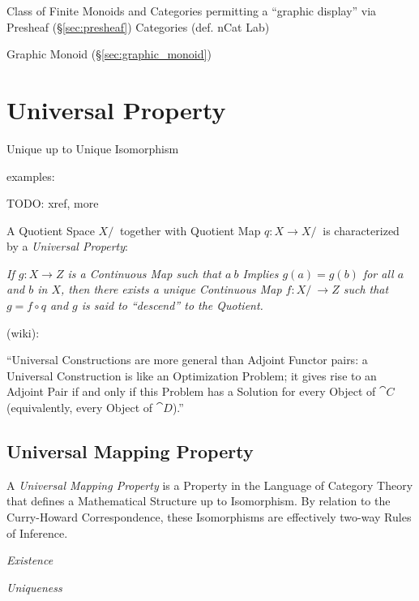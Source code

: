 Class of Finite Monoids and Categories permitting a ``graphic
display'' via Presheaf (\S\ref{sec:presheaf}) Categories
(def. nCat Lab) %

Graphic Monoid (\S\ref{sec:graphic_monoid})



\section{Universal Property}\label{sec:universal_property}

Unique up to Unique Isomorphism

examples:

TODO: xref, more

A Quotient Space $X/~$ together with Quotient Map $q : X \rightarrow X/~$ is
characterized by a \emph{Universal Property}:

\emph{If $g : X \rightarrow Z$ is a Continuous Map such that $a ~ b$ Implies $g(a)
  = g(b)$ for all $a$ and $b$ in $X$, then there exists a unique Continuous Map
  $f : X/~ \rightarrow Z$ such that $g = f \circ q$ and $g$ is said to
  ``descend'' to the Quotient.}

(wiki):

``Universal Constructions are more general than Adjoint Functor pairs: a
Universal Construction is like an Optimization Problem; it gives rise to an
Adjoint Pair if and only if this Problem has a Solution for every Object of
$\cat{C}$ (equivalently, every Object of $\cat{D}$).''



\subsection{Universal Mapping Property}
\label{sec:universal_mapping_property}

A \emph{Universal Mapping Property} is a Property in the Language of
Category Theory that defines a Mathematical Structure up to
Isomorphism. By relation to the Curry-Howard Correspondence, these
Isomorphisms are effectively two-way Rules of Inference.

\emph{Existence}

\emph{Uniqueness}

